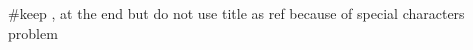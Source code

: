 
\chapter{}
\thispagestyle{empty}


 \#{keep , at the end but do not use title as ref because of special characters problem}
	{}

